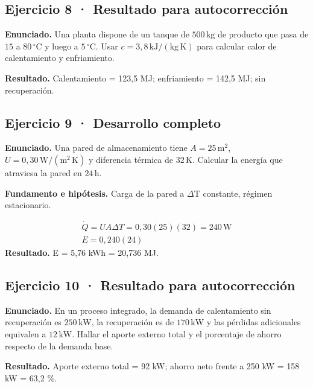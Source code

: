 \documentclass[11pt,a4paper]{article}
\begin{document}
\subsection*{Ejercicio 8 · Resultado para autocorrección}
\textbf{Enunciado.} Una planta dispone de un tanque de \(500\,\mathrm{kg}\) de producto que pasa de \(15\) a \(80\,^\circ\mathrm C\) y luego a \(5\,^\circ\mathrm C\). Usar \(c=3{,}8\,\mathrm{kJ/(kg\,K)}\) para calcular calor de calentamiento y enfriamiento.

\textbf{Resultado.} Calentamiento = 123,5 MJ; enfriamiento = 142,5 MJ; sin recuperación.


\subsection*{Ejercicio 9 · Desarrollo completo}
\textbf{Enunciado.} Una pared de almacenamiento tiene \(A=25\,\mathrm m^2\), \(U=0{,}30\,\mathrm{W/(m^2\,K)}\) y diferencia térmica de \(32\,\mathrm K\). Calcular la energía que atraviesa la pared en \(24\,\mathrm h\).

\textbf{Fundamento e hipótesis.} Carga de la pared a \ensuremath{\Delta}T constante, régimen estacionario.

\[
\begin{gathered}
\dot Q=UA\Delta T=0{,}30(25)(32)=240\,\mathrm W\\E=0{,}240(24)
\end{gathered}
\]
\textbf{Resultado.} E = 5,76 kWh = 20,736 MJ.


\subsection*{Ejercicio 10 · Resultado para autocorrección}
\textbf{Enunciado.} En un proceso integrado, la demanda de calentamiento sin recuperación es \(250\,\mathrm{kW}\), la recuperación es de \(170\,\mathrm{kW}\) y las pérdidas adicionales equivalen a \(12\,\mathrm{kW}\). Hallar el aporte externo total y el porcentaje de ahorro respecto de la demanda base.

\textbf{Resultado.} Aporte externo total = 92 kW; ahorro neto frente a 250 kW = 158 kW = 63,2 \%.


\clearpage
\end{document}

